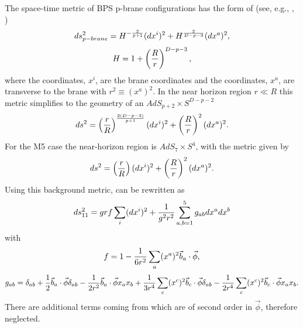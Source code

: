 \documentclass[a4paper,11pt]{article}
\begin{document}
The space-time metric of BPS p-brane
configurations has the form of (see, e.g., \cite{gt}, \cite{ckktp})
\begin{equation}\plabel{ds}
ds^2_{p-brane}=H^{-{2\over p+1}}(dx^i)^2+H^{2\over D-p-3}(dx^a)^2,
\end{equation}
\begin{equation}\plabel{H}
H=1+\left( {R\over r} \right)^{D-p-3},
\end{equation}
where the coordinates, $x^i$, are the brane coordinates and the
coordinates, $x^a$,
are transverse to the brane with $r^2 \equiv(x^a)^2$.
In the near horizon region $r\ll R$ this metric simplifies to the
geometry of an $AdS_{p+2}\times S^{D-p-2}$
\begin{equation}\plabel{ads}
ds^2=\left( {r\over R}\right)^{2(D-p-3)\over p+1} (dx^i)^2+
\left({R\over r}\right)^2 (dx^a)^2.
\end{equation}
For the M5 case the near-horizon region
is $AdS_7\times S^4$, with the metric given by
\begin{equation}\plabel{ads7}
ds^2=\left( {r\over R}\right) (dx^i)^2+
\left({R\over r}\right)^2 (dx^a)^2.
\end{equation}
Using this background metric,  can be rewritten as
\begin{equation}\plabel{exp1}
ds^2_{11}=grf\sum_i (dx^i)^2+{1\over g^2 r^2}\sum_{a,b=1}^5 g_{ab}dx^a
dx^b
\end{equation}
with
\begin{equation}\plabel{f}
f=1-{1\over 6r^2}\sum_a (x^a)^2\vec{b}_{a}\cdot \vec{\phi},
\end{equation}
\begin{equation}\plabel{gab}
g_{ab}=\d_{ab}+{1\over 2}\vec{b}_a\cdot \vec{\phi}\d_{ab}-{1\over 2r^2}
\vec{b}_a\cdot \vec{\phi}x_a x_b+{1\over 3r^4}\sum_c (x^c)^2
\vec{b}_c\cdot \vec{\phi}\d_{ab}-{1\over 2r^4}\sum_c (x^c)^2
\vec{b}_c\cdot \vec{\phi} x_a x_b.
\end{equation}
There are additional terms coming from  which are of
second order in $\vec{\phi}$, therefore neglected.
\end{document}
